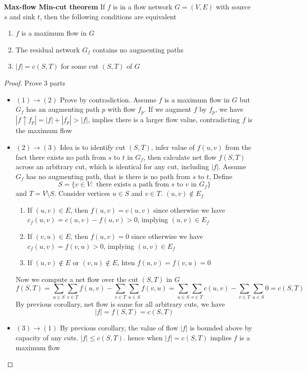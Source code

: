 \documentclass[11pt]{article}
\begin{document}
\begin{theorem*}
    \textbf{Max-flow Min-cut theorem} If $f$ is in a flow network $G = (V,E)$ with source $s$ and sink $t$, then the following conditions are equivalent 
    \begin{enumerate}
        \item $f$ is a maximum flow in $G$
        \item The residual network $G_f$ contains no augmenting paths 
        \item $|f| = c(S,T)$ for some cut $(S,T)$ of $G$
    \end{enumerate}

    \begin{proof}
        Prove 3 parts
        \begin{itemize}
            \item $(1) \to (2)$ Prove by contradiction. Assume $f$ is a maximum flow in $G$ but $G_f$ has an augmenting path $p$ with flow $f_p$. If we augment $f$ by $f_p$, we have $|f \uparrow f_p| = |f| + |f_p| > |f|$, implies there is a larger flow value, contradicting $f$ is the maximum flow
            \item $(2) \to (3)$ Idea is to identify cut $(S,T)$, infer value of $f(u,v)$ from the fact there exists no path from $s$ to $t$ in $G_f$, then calculate net flow $f(S,T)$ across an arbitrary cut, which is identical for any cut, including $|f|$. Assume $G_f$ has no augmenting path, that is there is no path from $s$ to $t$, Define 
            \[
                S = \{v\in V: \text{ there exists a path from $s$ to $v$ in $G_f$}  \}
            \]
            and $T = V \setminus S$. Consider vertices $u\in S$ and $v\in T$. $(u,v) \not\in E_f$ 
            \begin{enumerate}
                \item If $(u,v)\in E$, then $f(u,v) = c(u,v)$ since otherwise we have $c_f(u, v) = c(u,v) - f(u,v) > 0$, implying $(u,v)\in E_f$
                \item If $(v,u)\in E$, then $f(u,v) = 0$ since otherwise we have $c_f(u,v) = f(v,u) > 0$, implying $(u,v) \in E_f$
                \item If $(u,v)\not\in E$ or $(v,u)\not\in E$, hten $f(u,v) = f(v,u) = 0$
            \end{enumerate}
            Now we compute a net flow over the cut $(S,T)$ in $G$
            \[
                f(S,T) = \sum_{u\in S}\sum_{v\in T} f(u,v) - \sum_{v\in T}\sum_{u\in S} f(v,u) = \sum_{u\in S}\sum_{v\in T} c(u,v) - \sum_{v\in T}\sum_{u\in S} 0 = c(S,T)
            \]
            By previous corollary, net flow is same for all arbitrary cuts, we have 
            \[
                |f| = f(S,T) = c(S,T)
            \]
            \item $(3) \to (1)$ By previous corollary, the value of flow $|f|$ is bounded above by capacity of any cuts. $|f| \leq c(S,T)$. hence when $|f| = c(S,T)$ implies $f$ is a maximum flow
        \end{itemize}
    \end{proof}
\end{theorem*}
\end{document}
